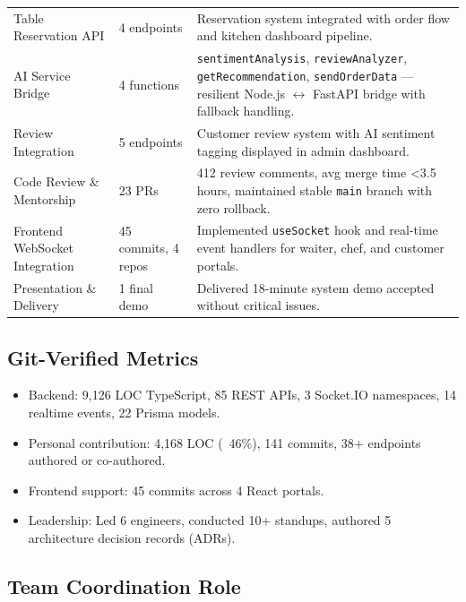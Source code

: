 \begin{center}
\begin{xltabular}{\textwidth}{@{}p{0.26\textwidth}p{0.14\textwidth}X@{}}
Table Reservation API &
4 endpoints &
Reservation system integrated with order flow and kitchen dashboard pipeline. \\

AI Service Bridge &
4 functions &
\texttt{sentimentAnalysis}, \texttt{reviewAnalyzer}, \texttt{getRecommendation}, \texttt{sendOrderData} --- resilient Node.js $\leftrightarrow$ FastAPI bridge with fallback handling. \\

Review Integration &
5 endpoints &
Customer review system with AI sentiment tagging displayed in admin dashboard. \\

Code Review \& Mentorship &
23 PRs &
412 review comments, avg merge time <3.5 hours, maintained stable \texttt{main} branch with zero rollback. \\

Frontend WebSocket Integration &
45 commits, 4 repos &
Implemented \texttt{useSocket} hook and real-time event handlers for waiter, chef, and customer portals. \\

Presentation \& Delivery &
1 final demo &
Delivered 18-minute system demo accepted without critical issues. \\

\bottomrule
\end{xltabular}
\end{center}

\subsection{Git-Verified Metrics}

\begin{itemize}
\item Backend: 9,126 LOC TypeScript, 85 REST APIs, 3 Socket.IO namespaces, 14 realtime events, 22 Prisma models.
\item Personal contribution: 4,168 LOC (~46\%), 141 commits, 38+ endpoints authored or co-authored.
\item Frontend support: 45 commits across 4 React portals.
\item Leadership: Led 6 engineers, conducted 10+ standups, authored 5 architecture decision records (ADRs).
\end{itemize}

\subsection{Team Coordination Role}


